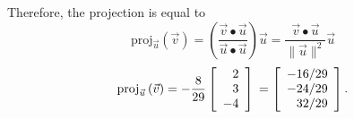 \documentclass{article}
\begin{document}
\begin{description}[style=nextline]
Therefore, the projection is equal to
$$\mathrm{proj}_{\vec{u}}\left( \vec{v}\right) =\left( \frac{\vec{v}\bullet \vec{u}}{\vec{u}\bullet \vec{u}}\right) \vec{u} = \frac{\vec{v}\bullet \vec{u}}{\| \vec{u}\| ^{2}}\vec{u}$$
$$\mathrm{proj}_{\vec{u}}\left( \vec{v}\right) =-\frac{8}{29} \left[ \begin{array}{r} 2 \\ 3 \\ -4 \end{array} \right] \\ = \left[ \begin{array}{r} - 16/29 \\ - 24/29 \\ 32/29 \end{array} \right].$$


\end{description}
\end{document}
